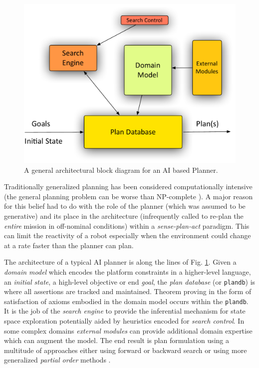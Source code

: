 \begin{figure}[!t]
 \centering
 \includegraphics[scale=0.4]{figs/planner-arch.pdf}
 \caption{\small A general architectural block diagram for an AI based
   Planner.}
 \label{fig:planner}
\end{figure}

Traditionally generalized planning has been considered computationally
intensive (the general planning problem can be worse than NP-complete
\cite{ghallab04}). A major reason for this belief had to do with the
role of the planner (which was assumed to be generative) and its place
in the architecture (infrequently called to re-plan the \emph{entire}
mission in off-nominal conditions) within a \emph{sense-plan-act}
paradigm. This can limit the reactivity of a robot especially when the
environment could change at a rate faster than the planner can plan.

The architecture of a typical AI planner is along the lines of
Fig. \ref{fig:planner}. Given a \emph{domain model} which encodes the
platform constraints in a higher-level language, an \emph{initial
  state}, a high-level objective or end \emph{goal}, the \emph{plan
  database} (or \texttt{plandb}) is where all assertions are tracked
and maintained. Theorem proving in the form of satisfaction of axioms
embodied in the domain model occurs within the \texttt{plandb}. It is
the job of the \emph{search engine} to provide the inferential
mechanism for state space exploration potentially aided by heuristics
encoded for \emph{search control}. In some complex domains
\cite{mus98} \emph{external modules} can provide additional domain
expertise which can augment the model. The end result is plan
formulation using a multitude of approaches either using forward or
backward search or using more generalized \emph{partial order} methods
\cite{ghallab04}.



